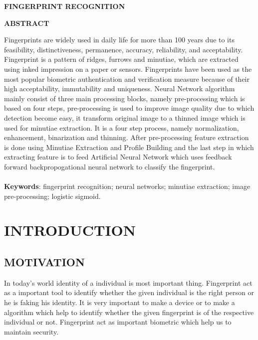 \documentclass[a4paper, 12pt]{article}
\begin{document}
    \begin{center}
    
        
        \large
        \textbf{FINGERPRINT RECOGNITION}
        \linebreak

     \end{center}


\large
\textbf{ABSTRACT}
\vspace{1em}

\par
Fingerprints are widely used in daily life for more than 100 years due to its feasibility, distinctiveness, permanence, accuracy, reliability, and acceptability. Fingerprint is a pattern of ridges, furrows and minutiae, which are extracted using inked impression on a paper or sensors. Fingerprints have been used as the most popular biometric authentication and verification measure because of their high acceptability, immutability and uniqueness. Neural Network algorithm mainly consist of three main processing blocks, namely pre-processing which is based on four steps, pre-processing is used to improve image quality due to which detection become easy, it transform original image to a thinned image which is used for minutiae extraction. It is a four step process, namely normalization, enhancement, binarization and thinning. After pre-processing feature extraction is done using Minutiae Extraction and Profile Building and the last step in which extracting feature is to feed Artificial Neural Network which uses feedback forward backpropogational neural network to classify the fingerprint.\\\\
\textbf{Keywords}: fingerprint recognition; neural networks; minutiae extraction; image pre-processing; logistic sigmoid.
\section{INTRODUCTION}
\subsection{MOTIVATION}
In today’s world identity of a individual is most important thing. Fingerprint act as a important tool to identify whether the given individual is the right person or he is faking his identity. It is very important to make a device or to make a algorithm which help to identify whether the given fingerprint is of the respective individual or not. Fingerprint act as important biometric which help us to maintain security.
\end{document}
